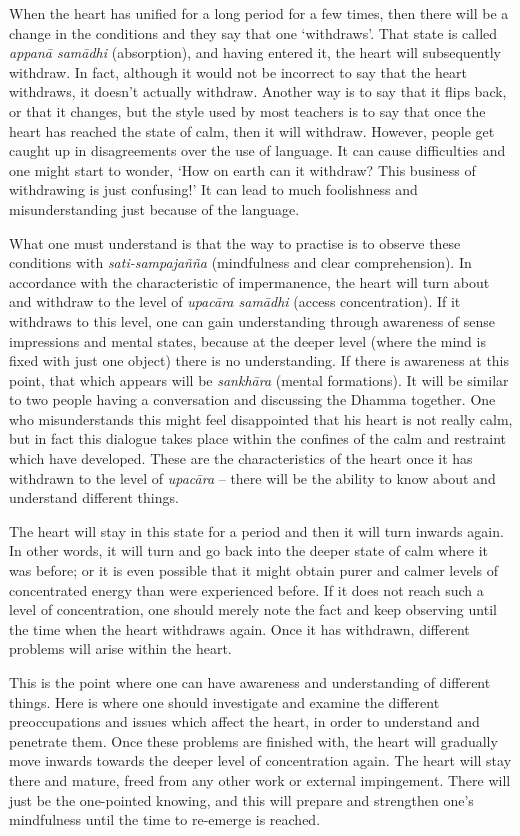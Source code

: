 When the heart has unified for a long period for a few times, then there
will be a change in the conditions and they say that one `withdraws'. 
That state is called \emph{appanā samādhi} (absorption), and having
entered it, the heart will subsequently withdraw. In fact, although it
would not be incorrect to say that the heart withdraws, it doesn't
actually withdraw. Another way is to say that it flips back, or that it
changes, but the style used by most teachers is to say that once the
heart has reached the state of calm, then it will withdraw. However, 
people get caught up in disagreements over the use of language. It can
cause difficulties and one might start to wonder, `How on earth can it
withdraw? This business of withdrawing is just confusing!' It can lead
to much foolishness and misunderstanding just because of the language. 

What one must understand is that the way to practise is to observe these
conditions with \emph{sati-sampajañña} (mindfulness and clear
comprehension). In accordance with the characteristic of impermanence, 
the heart will turn about and withdraw to the level of \emph{upacāra
samādhi} (access concentration). If it withdraws to this level, one can
gain understanding through awareness of sense impressions and mental
states, because at the deeper level (where the mind is fixed with just
one object) there is no understanding. If there is awareness at this
point, that which appears will be \emph{sankhāra} (mental formations). 
It will be similar to two people having a conversation and discussing
the Dhamma together. One who misunderstands this might feel disappointed
that his heart is not really calm, but in fact this dialogue takes place
within the confines of the calm and restraint which have developed. 
These are the characteristics of the heart once it has withdrawn to the
level of \emph{upacāra} -- there will be the ability to know about and
understand different things. 

The heart will stay in this state for a period and then it will turn
inwards again. In other words, it will turn and go back into the deeper
state of calm where it was before; or it is even possible that it might
obtain purer and calmer levels of concentrated energy than were
experienced before. If it does not reach such a level of concentration, 
one should merely note the fact and keep observing until the time when
the heart withdraws again. Once it has withdrawn, different problems
will arise within the heart. 

This is the point where one can have awareness and understanding of
different things. Here is where one should investigate and examine the
different preoccupations and issues which affect the heart, in order to
understand and penetrate them. Once these problems are finished with, 
the heart will gradually move inwards towards the deeper level of
concentration again. The heart will stay there and mature, freed from
any other work or external impingement. There will just be the
one-pointed knowing, and this will prepare and strengthen one's
mindfulness until the time to re-emerge is reached. 


